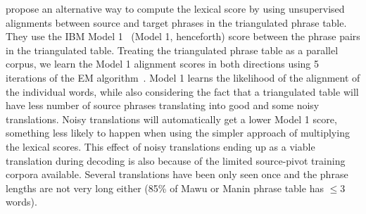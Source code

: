 \documentclass[11pt]{article}
\begin{document}
 \label{sec:model1} \cite{Cohn:07} propose an alternative way to compute the lexical score by using unsupervised alignments between source and target phrases in the triangulated phrase table. They use the IBM Model 1~\cite{Brown:1993} (Model 1, henceforth) score between the phrase pairs in the triangulated table. Treating the triangulated phrase table as a parallel corpus, we learn the Model 1 alignment scores in both directions using 5 iterations of the EM algorithm~\cite{Dempster:77}. 
%
%
Model 1 learns the likelihood of the alignment of the individual words, while also considering the fact that a triangulated table will have less number of source phrases translating into good and some noisy translations. Noisy translations will automatically get a lower Model 1 score, something less likely to happen when using the simpler approach of multiplying the lexical scores. This effect of noisy translations ending up as a viable translation during decoding is also because of the limited source-pivot training corpora available. Several translations have been only seen once and the phrase lengths are not very long either (85\% of Mawu or Manin phrase table has $\leq 3$ words).

\end{document}
